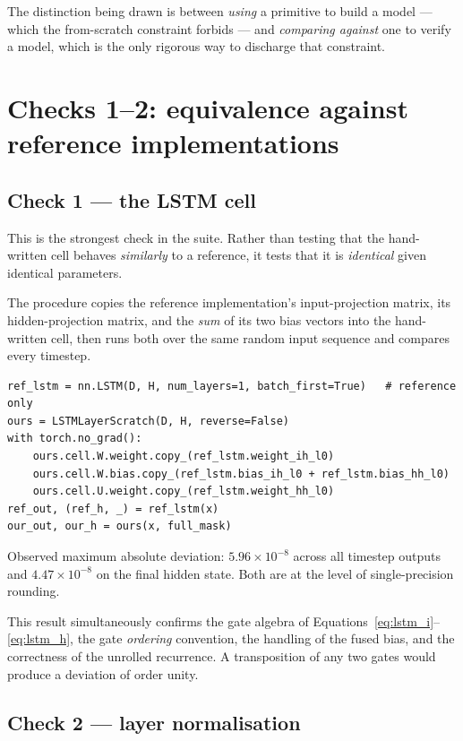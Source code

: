 The distinction being drawn is between \emph{using} a primitive to build a model --- which the
from-scratch constraint forbids --- and \emph{comparing against} one to verify a model, which is
the only rigorous way to discharge that constraint.

\section{Checks 1--2: equivalence against reference implementations}

\subsection{Check 1 --- the LSTM cell}

This is the strongest check in the suite. Rather than testing that the hand-written cell behaves
\emph{similarly} to a reference, it tests that it is \emph{identical} given identical parameters.

The procedure copies the reference implementation's input-projection matrix, its hidden-projection
matrix, and the \emph{sum} of its two bias vectors into the hand-written cell, then runs both over
the same random input sequence and compares every timestep.

{\small
\begin{verbatim}
ref_lstm = nn.LSTM(D, H, num_layers=1, batch_first=True)   # reference only
ours = LSTMLayerScratch(D, H, reverse=False)
with torch.no_grad():
    ours.cell.W.weight.copy_(ref_lstm.weight_ih_l0)
    ours.cell.W.bias.copy_(ref_lstm.bias_ih_l0 + ref_lstm.bias_hh_l0)
    ours.cell.U.weight.copy_(ref_lstm.weight_hh_l0)
ref_out, (ref_h, _) = ref_lstm(x)
our_out, our_h = ours(x, full_mask)
\end{verbatim}}

Observed maximum absolute deviation: $5.96\times10^{-8}$ across all timestep outputs and
$4.47\times10^{-8}$ on the final hidden state. Both are at the level of single-precision rounding.

This result simultaneously confirms the gate algebra of
Equations~\ref{eq:lstm_i}--\ref{eq:lstm_h}, the gate \emph{ordering} convention, the handling of
the fused bias, and the correctness of the unrolled recurrence. A transposition of any two gates
would produce a deviation of order unity.

\subsection{Check 2 --- layer normalisation}

